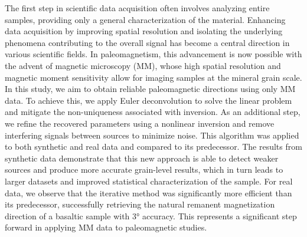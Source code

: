 The first step in scientific data acquisition often involves analyzing entire samples, providing only a general characterization of the material. Enhancing data acquisition by improving spatial resolution and isolating the underlying phenomena contributing to the overall signal has become a central direction in various scientific fields. In paleomagnetism, this advancement is now possible with the advent of magnetic microscopy (MM), whose high spatial resolution and magnetic moment sensitivity allow for imaging samples at the mineral grain scale. In this study, we aim to obtain reliable paleomagnetic directions using only MM data. To achieve this, we apply Euler deconvolution to solve the linear problem and mitigate the non-uniqueness associated with inversion. As an additional step, we refine the recovered parameters using a nonlinear inversion and remove interfering signals between sources to minimize noise. This algorithm was applied to both synthetic and real data and compared to its predecessor. The results from synthetic data demonstrate that this new approach is able to detect weaker sources and produce more accurate grain-level results, which in turn leads to larger datasets and improved statistical characterization of the sample. For real data, we observe that the iterative method was significantly more efficient than its predecessor, successfully retrieving the natural remanent magnetization direction of a basaltic sample with \ang{3} accuracy. This represents a significant step forward in applying MM data to paleomagnetic studies.